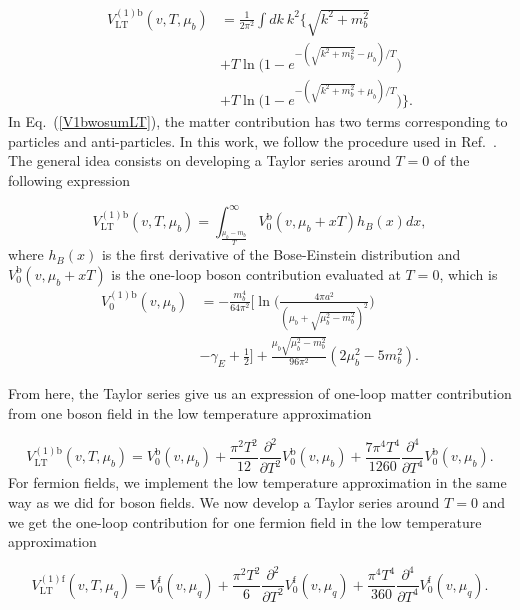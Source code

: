 \documentclass[%
 reprint,
showpacs,preprintnumbers,
 amsmath,amssymb,
onecolumn]{revtex4}
\begin{document}
\begin{align}
    V_{\text{LT}}^{(1)\text{b}}(v,T,\mu_b)&=\frac{1}{2\pi^2}\int dk \ k^2\Big \{ \sqrt{k^2+m_b^2}\nonumber \\
    &+T\ln \Big(1-e^{-(\sqrt{k^2+m_b^2}-\mu_b)/T} \Big)\nonumber \\
    &+T\ln \Big(1-e^{-(\sqrt{k^2+m_b^2}+\mu_b)/T} \Big) \Big \}.
    \label{V1bwosumLT}
\end{align}
In Eq.~(\ref{V1bwosumLT}), the matter contribution has two terms corresponding to particles and anti-particles. In this work, we follow the procedure used in Ref.~\cite{chilenos}. The general idea consists on developing a Taylor series around $T=0$ of the following expression

\begin{equation}
    V_{\text{LT}}^{(1)\text{b}}(v,T,\mu_b)=\int_{\frac{\mu_b-m_b}{T}}^\infty V_0^{\text{b}}(v,\mu_b+xT)h_B(x)dx,
    \label{1lLT}
\end{equation}
where $h_B(x)$ is the first derivative of the Bose-Einstein distribution and $V_0^{\text{b}}(v,\mu_b+xT)$ is the one-loop boson contribution evaluated at $T=0$, which is
\begin{align}
    V_{0}^{(1)\text{b}}(v,\mu_b)&=-\frac{m_b^4}{64\pi^2}\Big[ \ln\Big( \frac{4\pi a^2}{(\mu_b+\sqrt{\mu_b^2-m_b^2})^2} \Big)\nonumber \\
    &-\gamma_E+\frac{1}{2}\Big]+\frac{\mu_b\sqrt{\mu_b^2-m_b^2}}{96\pi^2}(2\mu_b^2-5m_b^2).
    \label{V1bLT}
\end{align}

From here, the Taylor series give us an expression of one-loop matter contribution from one boson field in the low temperature approximation

\begin{equation}
    V_{\text{LT}}^{(1)\text{b}}(v,T,\mu_b)=V_0^{\text{b}}(v,\mu_b)+\frac{\pi^2 T^2}{12}\frac{\partial^2}{\partial T^2}V_0^{\text{b}}(v,\mu_b) +\frac{7\pi^4 T^4}{1260}\frac{\partial^4}{\partial T^4}V_0^{\text{b}}(v,\mu_b).
    \label{1loopBLT}
\end{equation}
For fermion fields, we implement the low temperature approximation in the same way as we did for boson fields. We now develop a Taylor series around $T=0$ and we get the one-loop contribution for one fermion field in the low temperature approximation
 
\begin{equation}
    V_{\text{LT}}^{(1)\text{f}}(v,T,\mu_q)=V_0^{\text{f}}(v,\mu_q)+\frac{\pi^2 T^2}{6}\frac{\partial^2}{\partial T^2}V_0^{\text{f}}(v,\mu_q)+\frac{\pi^4 T^4}{360}\frac{\partial^4}{\partial T^4}V_0^{\text{f}}(v,\mu_q).
    \label{1loopFLT}
\end{equation}
\end{document}
